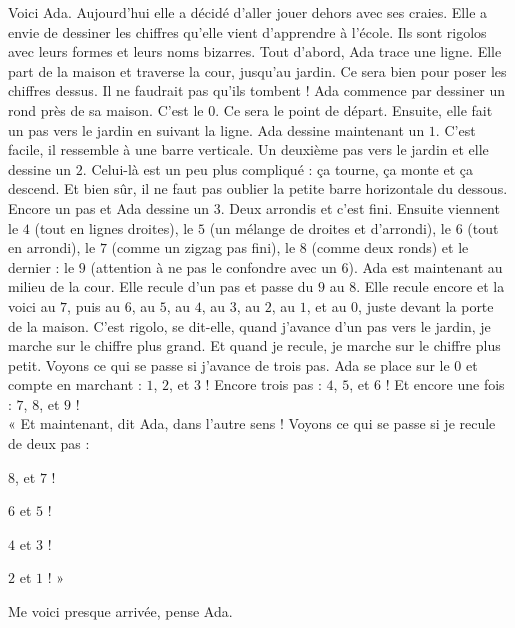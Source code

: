 Voici Ada. Aujourd'hui elle a décidé d'aller jouer dehors avec ses craies. 
Elle a envie de dessiner les chiffres qu'elle vient d'apprendre à l'école. Ils sont rigolos avec leurs formes et leurs noms bizarres.
Tout d'abord, Ada trace une ligne. Elle part de la maison et traverse la cour, jusqu'au jardin. 
Ce sera bien pour poser les chiffres dessus. Il ne faudrait pas qu'ils tombent ! 
Ada commence par dessiner un rond près de sa maison. C'est le $0$. Ce sera le point de départ. 
Ensuite, elle fait un pas vers le jardin en suivant la ligne. Ada dessine maintenant un $1$. C'est facile, il ressemble à une barre verticale. 
Un deuxième pas vers le jardin et elle dessine un $2$. Celui-là est un peu plus compliqué : ça tourne, ça monte et ça descend. Et bien sûr, il ne faut pas oublier la petite barre horizontale du dessous.
Encore un pas et Ada dessine un $3$. Deux arrondis et c'est fini.
Ensuite viennent le $4$ (tout en lignes droites), le $5$ (un mélange de droites et d'arrondi), le $6$ (tout en arrondi), le $7$ (comme un zigzag pas fini), le $8$ (comme deux ronds) et le dernier : le $9$ (attention à ne pas le confondre avec un $6$). 
Ada est maintenant au milieu de la cour. Elle recule d'un pas et passe du $9$ au $8$. Elle recule encore et la voici au $7$, puis au $6$, au $5$, au $4$, au $3$, au $2$, au $1$, et au $0$, juste devant la porte de la maison. 
C'est rigolo, se dit-elle, quand j'avance d'un pas vers le jardin, je marche sur le chiffre plus grand. Et quand je recule, je marche sur le chiffre plus petit. 
Voyons ce qui se passe si j'avance de trois pas. Ada se place sur le $0$ et compte en marchant : $1$, $2$, et $3$ ! Encore trois pas : $4$, $5$, et $6$ ! Et encore une fois : $7$, $8$, et $9$ ! \\
« Et maintenant, dit Ada, dans l'autre sens ! Voyons ce qui se passe si je recule de deux pas : 
\begin{description}
    \item $8$, et $7$ ! 
    \item $6$ et $5$ ! 
    \item $4$ et $3$ ! 
    \item $2$ et $1$ ! »
\end{description} 
Me voici presque arrivée, pense Ada.


%    
